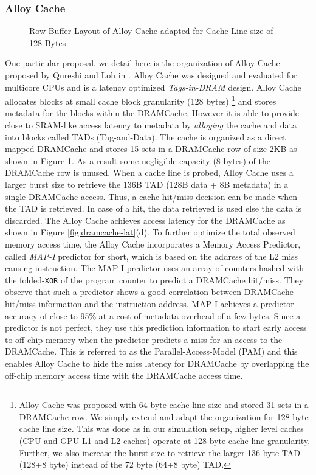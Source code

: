 \subsubsection{Alloy Cache} \label{alloy-background}
\begin{figure}[!htb]
	\centering
	\def\svgwidth{\columnwidth}
	
	\caption{Row Buffer Layout of Alloy Cache adapted for Cache Line size of 128 Bytes}
	\label{fig:dramcache-rb}
\end{figure}
\par One particular proposal, we detail here is the organization of Alloy Cache proposed by Qureshi and Loh in \cite{alloy}. Alloy Cache was designed and evaluated for multicore CPUs and is a latency optimized \textit{Tags-in-DRAM} design. Alloy Cache allocates blocks at small cache block granularity (128 bytes)
\footnote{Alloy Cache was proposed with 64 byte cache line size and stored 31 sets in a DRAMCache row. We simply extend and adapt the organization for 128 byte cache line size. This was done as in our simulation setup, higher level caches (CPU and GPU L1 and L2 caches) operate at 128 byte cache line granularity. Further, we also increase the burst size to retrieve the larger 136 byte TAD (128+8 byte) instead of the 72 byte (64+8 byte) TAD.} 
and stores metadata for the blocks within the DRAMCache. However it is able to provide close to SRAM-like access latency to metadata by \textit{alloying} the cache and data into blocks called TADs (Tag-and-Data). The cache is organized as a direct mapped DRAMCache and stores 15 sets in a DRAMCache row of size 2KB as shown in Figure \ref{fig:dramcache-rb}. As a result some negligible capacity (8 bytes) of the DRAMCache row is unused. When a cache line is probed, Alloy Cache uses a larger burst size to retrieve the 136B TAD (128B data + 8B metadata) in a single DRAMCache access. Thus, a cache hit/miss decision can be made when the TAD is retrieved. In case of a hit, the data retrieved is used else the data is discarded. The Alloy Cache achieves access latency for the DRAMCache as shown in Figure \ref{fig:dramcache-lat}(d). To further optimize the total observed memory access time, the Alloy Cache incorporates a Memory Access Predictor, called \textit{MAP-I} predictor \cite{alloy} for short, which is based on the address of the L2 miss causing instruction. The MAP-I predictor uses an array of counters hashed with the folded-{\tt XOR} of the program counter to predict a DRAMCache hit/miss. They observe that such a predictor shows a good correlation between DRAMCache hit/miss information and the instruction address. MAP-I achieves a predictor accuracy of close to 95\% at a cost of metadata overhead of a few bytes. Since a predictor is not perfect, they use this prediction information to start early access to off-chip memory when the predictor predicts a miss for an access to the DRAMCache. This is referred to as the Parallel-Access-Model (PAM) and this enables Alloy Cache to hide the miss latency for DRAMCache by overlapping the off-chip memory access time with the DRAMCache access time.


